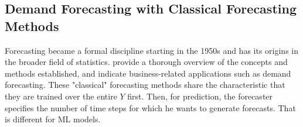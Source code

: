 \subsection{Demand Forecasting with Classical Forecasting Methods}
\label{class_methods}

Forecasting became a formal discipline starting in the 1950s and has its
    origins in the broader field of statistics.
\cite{hyndman2018} provide a thorough overview of the concepts and methods
    established, and \cite{ord2017} indicate business-related applications
    such as demand forecasting.
These "classical" forecasting methods share the characteristic that they are
    trained over the entire $Y$ first.
Then, for prediction, the forecaster specifies the number of time steps for
    which he wants to generate forecasts.
That is different for ML models.

